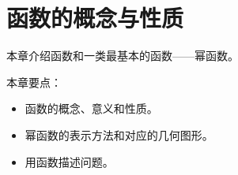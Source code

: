 \chapter{函数的概念与性质}

本章介绍函数和一类最基本的函数——幂函数。

本章要点：
\begin{itemize}
    \item 函数的概念、意义和性质。
    \item 幂函数的表示方法和对应的几何图形。
    \item 用函数描述问题。
\end{itemize}

\newpage


\newpage


\newpage


\newpage


\newpage


\newpage





